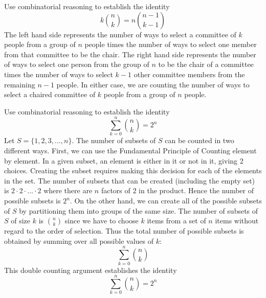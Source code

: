 \documentclass[handout]{ximera}
\begin{document}
\begin{example}[example 3]
Use combinatorial reasoning to establish the identity
\[
k \binom{n}{k} = n\binom{n-1}{k-1}
\]
The left hand side represents the number of ways to select a committee of $k$ people from a group 
of $n$ people times the number of ways to select one member from that committee to be the chair. 
The right hand side represents the number of ways to select one person from the group of $n$ to be the 
chair of a committee times the number of ways to select $k-1$ other committee members from 
the remaining $n-1$ people.  In either case, we are counting the number of ways to select 
a chaired committee of $k$ people from a group of $n$ people.
\end{example}



\begin{example}[example 4]
Use combinatorial reasoning to establish the identity
\[
\sum_{k=0}^n \binom{n}{k} = 2^n
\]
Let $S = \{1,2,3,...,n\}$. The number of subsets of $S$ can be counted in two different ways.
First, we can use the Fundamental Principle of Counting element by element. 
In a given subset, an element is either in it or not in it, giving 2 choices. 
Creating the subset requires making this decision for each of the elements in the set. 
The number of subsets that can be created (including the empty set) 
is $2 \cdot 2 \cdot \ldots \cdot 2$ where there are $n$ factors of $2$ in the product.  
Hence the number of possible subsets is $2^n$.
On the other hand, we can create all of the possible subsets of $S$ by partitioning them 
into groups of the same size.
The number of subsets of $S$ of size $k$ is $\binom{n}{k}$ since we have to choose $k$ items from a 
set of $n$ items without regard to the order of selection. Thus the total number of possible 
subsets is obtained by summing over all possible values of $k$:
\[
\sum_{k=0}^n \binom{n}{k}
\]
This double counting argument establishes the identity
\[
\sum_{k=0}^n \binom{n}{k} = 2^n
\]

\end{example}
\end{document}
